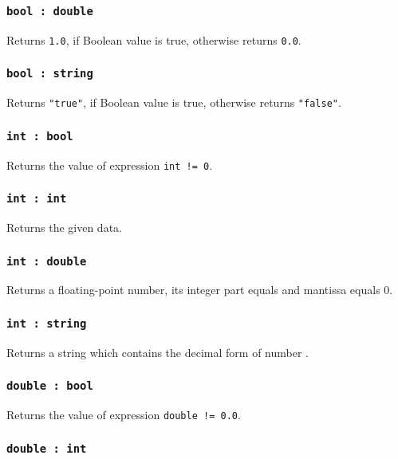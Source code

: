 \subsubsection{\texttt{bool : double}}

Returns \texttt{1.0}, if Boolean value is true, otherwise returns \texttt{0.0}.

\subsubsection{\texttt{bool : string}}

Returns \texttt{"true"}, if Boolean value is true, otherwise returns \texttt{"false"}.

\subsubsection{\texttt{int : bool}}

Returns the value of expression \texttt{int != 0}.

\subsubsection{\texttt{int : int}}

Returns the given data.

\subsubsection{\texttt{int : double}}

Returns a floating-point number, its integer part equals  \integer{} and mantissa equals 0.

\subsubsection{\texttt{int : string}}

Returns a string which contains the decimal form of number \integer{}.

\subsubsection{\texttt{double : bool}}

Returns the value of expression \texttt{double != 0.0}.

\subsubsection{\texttt{double : int}}

